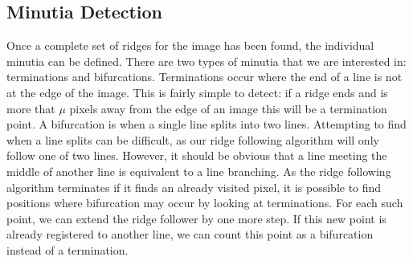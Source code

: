 \documentclass[11pt,a4paper]{article}
\begin{document}
\begin{multicols}{2}
	\subsection{Minutia Detection}
        Once a complete set of ridges for the image has been found, the individual minutia can be defined. There are two types of minutia that we are interested in: terminations and bifurcations. Terminations occur where the end of a line is not at the edge of the image. This is fairly simple to detect: if a ridge ends and is more that $\mu$ pixels away from the edge of an image this will be a termination point. A bifurcation is when a single line splits into two lines. Attempting to find when a line splits can be difficult, as our ridge following algorithm will only follow one of two lines. However, it should be obvious that a line meeting the middle of another line is equivalent to a line branching. As the ridge following algorithm terminates if it finds an already visited pixel, it is possible to find positions where bifurcation may occur by looking at terminations. For each such point, we can extend the ridge follower by one more step. If this new point is already registered to another line, we can count this point as a bifurcation instead of a termination.


\end{multicols}
\end{document}
